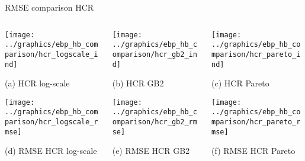 \begin{frame}{RMSE comparison HCR}
    \begin{columns}
        \begin{column}{0.32\textwidth}
            \centering

            \texttt{[image: ../graphics/ebp\_hb\_comparison/hcr\_logscale\_ind]}

            \scriptsize{(a) HCR log-scale}

            \texttt{[image: ../graphics/ebp\_hb\_comparison/hcr\_logscale\_rmse]}

            \scriptsize{(d) RMSE HCR log-scale}

        \end{column}



        \begin{column}{0.32\textwidth}
            \centering
            \texttt{[image: ../graphics/ebp\_hb\_comparison/hcr\_gb2\_ind]}

            \scriptsize{(b) HCR GB2}

            \texttt{[image: ../graphics/ebp\_hb\_comparison/hcr\_gb2\_rmse]}

            \scriptsize{(e) RMSE HCR GB2}
        \end{column}

        \begin{column}{0.32\textwidth}
            \centering
            \texttt{[image: ../graphics/ebp\_hb\_comparison/hcr\_pareto\_ind]}

            \scriptsize{(c) HCR Pareto}

            \texttt{[image: ../graphics/ebp\_hb\_comparison/hcr\_pareto\_rmse]}

            \scriptsize{(f) RMSE HCR Pareto}
        \end{column}
    \end{columns}
\end{frame}

